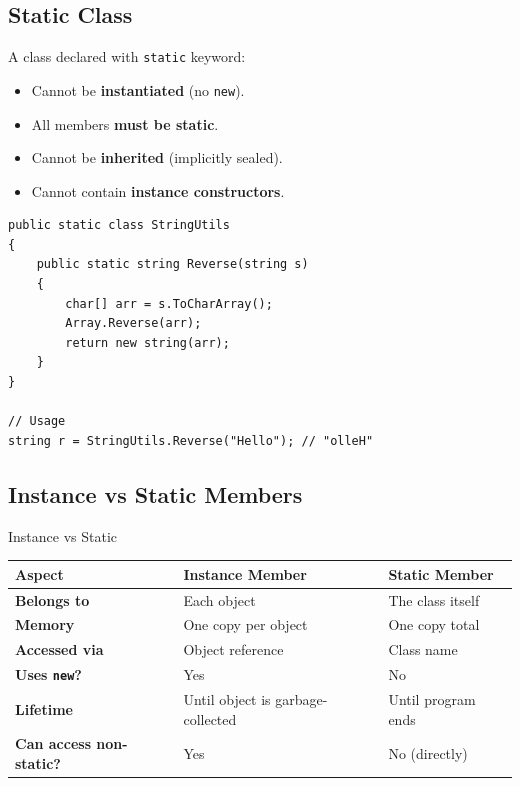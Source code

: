 \documentclass[11pt,a4paper]{article}
\newcommand{\rowcolortop}{\rowcolor{tableHead}\color{white}\bfseries}
\newcommand{\rowcolorlight}{\rowcolor{tableAlt}}
\begin{document}
\subsection{Static Class}

A class declared with \texttt{static} keyword:
\begin{itemize}[leftmargin=*]
    \item Cannot be \textbf{instantiated} (no \texttt{new}).
    \item All members \textbf{must be static}.
    \item Cannot be \textbf{inherited} (implicitly sealed).
    \item Cannot contain \textbf{instance constructors}.
\end{itemize}

\begin{lstlisting}[caption={Static class}]
public static class StringUtils
{
    public static string Reverse(string s)
    {
        char[] arr = s.ToCharArray();
        Array.Reverse(arr);
        return new string(arr);
    }
}

// Usage
string r = StringUtils.Reverse("Hello"); // "olleH"
\end{lstlisting}

\subsection{Instance vs Static Members}

\begin{compareBox}{Instance vs Static}
\begin{tabularx}{\linewidth}{|>{\bfseries}p{4cm}|X|X|}
\hline
\rowcolortop \color{white}Aspect & \color{white}Instance Member & \color{white}Static Member \\
\hline
Belongs to & Each object & The class itself \\
\rowcolorlight
Memory   & One copy per object & One copy total \\
Accessed via & Object reference & Class name \\
\rowcolorlight
Uses \texttt{new}? & Yes & No \\
Lifetime  & Until object is garbage-collected & Until program ends \\
\rowcolorlight
Can access non-static? & Yes & No (directly) \\
\hline
\end{tabularx}
\end{compareBox}
\end{document}
